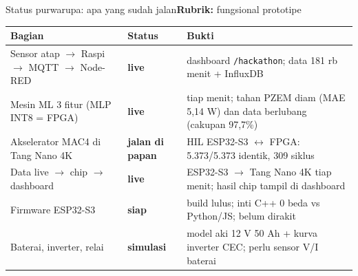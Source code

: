 \documentclass[aspectratio=169, 10pt]{beamer}
\newcommand{\kriteria}[1]{\hfill{\scriptsize\mdseries\color{krem!75}\textbf{Rubrik:} #1}}
\begin{document}
\begin{frame}[label=status]{Status purwarupa: apa yang sudah jalan\kriteria{fungsional prototipe}}
\footnotesize
\begin{tabularx}{\linewidth}{@{}l l X@{}}
\toprule
Bagian & Status & Bukti \\
\midrule
Sensor atap $\to$ Raspi $\to$ MQTT $\to$ Node-RED & \textcolor{genis}{\textbf{live}} & dashboard \texttt{/hackathon}; data 181 rb menit + InfluxDB \\
Mesin ML 3 fitur (MLP INT8 = FPGA) & \textcolor{genis}{\textbf{live}} & tiap menit; tahan PZEM diam (MAE 5,14 W) dan data berlubang (cakupan 97,7\%) \\
Akselerator MAC4 di Tang Nano 4K & \textcolor{genis}{\textbf{jalan di papan}} & HIL ESP32-S3 $\leftrightarrow$ FPGA: 5.373/5.373 identik, 309 siklus \\
Data live $\to$ chip $\to$ dashboard & \textcolor{genis}{\textbf{live}} & ESP32-S3 $\to$ Tang Nano 4K tiap menit; hasil chip tampil di dashboard \\
Firmware ESP32-S3 & \textcolor{alif}{\textbf{siap}} & build lulus; inti C++ 0 beda vs Python/JS; belum dirakit \\
Baterai, inverter, relai & \textcolor{lama}{\textbf{simulasi}} & model aki 12 V 50 Ah + kurva inverter CEC; perlu sensor V/I baterai \\
\bottomrule
\end{tabularx}\\[8pt]
\end{frame}
\end{document}
